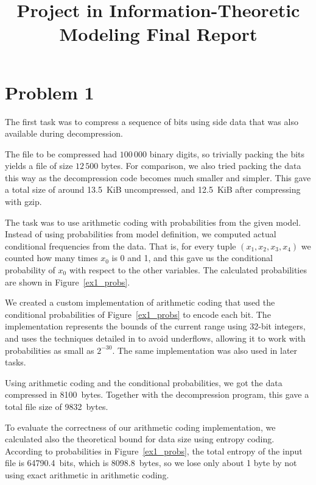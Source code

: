 \documentclass{article}
\title{Project in Information-Theoretic Modeling Final Report}
\begin{document}
\maketitle



\section{Problem 1}

The first task was to compress a sequence of bits using side data that was also available during decompression.

The file to be compressed had $100\,000$ binary digits, so trivially packing the bits yields a file of size $12\,500$ bytes.
For comparison, we also tried packing the data this way as the decompression code becomes much smaller and simpler.
This gave a total size of around 13.5~KiB uncompressed, and 12.5~KiB after compressing with gzip.

The task was to use arithmetic coding with probabilities from the given model.
Instead of using probabilities from model definition, we computed actual conditional frequencies from the data.
That is, for every tuple $(x_1,x_2,x_3,x_4)$ we counted how many times $x_0$ is 0 and 1, and this gave us the conditional probability of $x_0$ with respect to the other variables.
The calculated probabilities are shown in Figure~\ref{ex1_probs}.

We created a custom implementation of arithmetic coding that used the conditional probabilities of Figure~\ref{ex1_probs} to encode each bit. The implementation represents the bounds of the current range using 32-bit integers, and uses the techniques detailed in \cite{arith} to avoid underflows, allowing it to work with probabilities as small as $2^{-30}$. The same implementation was also used in later tasks.

Using arithmetic coding and the conditional probabilities, we got the data compressed in 8100~bytes.
Together with the decompression program, this gave a total file size of 9832~bytes.

To evaluate the correctness of our arithmetic coding implementation, we calculated also the theoretical bound for data size using entropy coding.
According to probabilities in Figure~\ref{ex1_probs}, the total entropy of the input file is 64790.4~bits, which is 8098.8~bytes, so we lose only about 1 byte by not using exact arithmetic in arithmetic coding.
\end{document}
